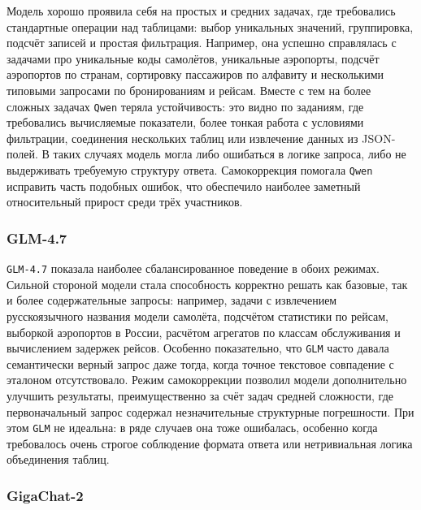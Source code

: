 Модель хорошо проявила себя на простых и средних задачах, где требовались
стандартные операции над таблицами: выбор уникальных значений, группировка, подсчёт
записей и простая фильтрация. Например, она успешно справлялась с задачами про
уникальные коды самолётов, уникальные аэропорты, подсчёт аэропортов по странам,
сортировку пассажиров по алфавиту и несколькими типовыми запросами по бронированиям
и рейсам. Вместе с тем на более сложных задачах \texttt{Qwen} теряла устойчивость:
это видно по заданиям, где требовались вычисляемые показатели, более тонкая работа
с условиями фильтрации, соединения нескольких таблиц или извлечение данных из
JSON-полей. В таких случаях модель могла либо ошибаться в логике запроса, либо не
выдерживать требуемую структуру ответа. Самокоррекция помогала \texttt{Qwen}
исправить часть подобных ошибок, что обеспечило наиболее заметный относительный
прирост среди трёх участников.

\subsubsection{GLM-4.7}

\texttt{GLM-4.7} показала наиболее сбалансированное поведение в обоих режимах.
Сильной стороной модели стала способность корректно решать как базовые, так и более
содержательные запросы: например, задачи с извлечением русскоязычного названия модели
самолёта, подсчётом статистики по рейсам, выборкой аэропортов в России, расчётом
агрегатов по классам обслуживания и вычислением задержек рейсов. Особенно
показательно, что \texttt{GLM} часто давала семантически верный запрос даже тогда,
когда точное текстовое совпадение с эталоном отсутствовало. Режим самокоррекции
позволил модели дополнительно улучшить результаты, преимущественно за счёт задач
средней сложности, где первоначальный запрос содержал незначительные структурные
погрешности. При этом \texttt{GLM} не идеальна: в ряде случаев она тоже ошибалась,
особенно когда требовалось очень строгое соблюдение формата ответа или нетривиальная
логика объединения таблиц.

\subsubsection{GigaChat-2}

